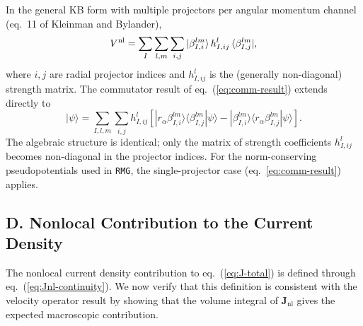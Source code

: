 In the general KB form with multiple projectors per angular momentum
channel (eq.~11 of Kleinman and Bylander\cite{kleinman-bylander-1982}),
\begin{equation}
  V^{\mathrm{nl}} = \sum_I\sum_{l,m}\sum_{i,j}
  |\beta^{lm}_{I,i}\rangle\, h^l_{I,ij}\,
  \langle\beta^{lm}_{I,j}|,
  \label{eq:KB-general}
\end{equation}
where $i,j$ are radial projector indices and $h^l_{I,ij}$ is the
(generally non-diagonal) strength matrix.
The commutator result of eq.~(\ref{eq:comm-result}) extends directly
to
\begin{equation}
  [\hat{r}_\alpha,\Vnl]|\psi\rangle
  = \sum_{I,l,m}\sum_{i,j} h^l_{I,ij}\!\left[
    |r_\alpha\beta^{lm}_{I,i}\rangle
    \langle\beta^{lm}_{I,j}|\psi\rangle
  - |\beta^{lm}_{I,i}\rangle
    \langle r_\alpha\beta^{lm}_{I,j}|\psi\rangle
    \right].
  \label{eq:comm-result-general}
\end{equation}
The algebraic structure is identical; only the matrix of strength
coefficients $h^l_{I,ij}$ becomes non-diagonal in the projector
indices.
For the norm-conserving pseudopotentials used in \texttt{RMG}, the
single-projector case (eq.~\ref{eq:comm-result}) applies.

\subsection*{D.\; Nonlocal Contribution to the Current Density}
\label{app:Jnl-expression}

The nonlocal current density contribution to
eq.~(\ref{eq:J-total}) is defined through
eq.~(\ref{eq:Jnl-continuity}).
We now verify that this definition is consistent with the velocity
operator result by showing that the volume integral of
$\mathbf{J}_\mathrm{nl}$ gives the expected macroscopic contribution.


